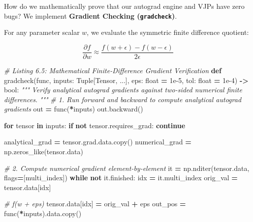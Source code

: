 \documentclass[
  letterpaper,
]{scrbook}
\newenvironment{Shaded}{\begin{snugshade}}{\end{snugshade}}
\newcommand{\BuiltInTok}[1]{#1}
\newcommand{\CommentTok}[1]{\textcolor[rgb]{0.56,0.35,0.01}{\textit{#1}}}
\newcommand{\ControlFlowTok}[1]{\textcolor[rgb]{0.13,0.29,0.53}{\textbf{#1}}}
\newcommand{\FloatTok}[1]{\textcolor[rgb]{0.00,0.00,0.81}{#1}}
\newcommand{\KeywordTok}[1]{\textcolor[rgb]{0.13,0.29,0.53}{\textbf{#1}}}
\newcommand{\NormalTok}[1]{#1}
\newcommand{\OperatorTok}[1]{\textcolor[rgb]{0.81,0.36,0.00}{\textbf{#1}}}
\newcommand{\StringTok}[1]{\textcolor[rgb]{0.31,0.60,0.02}{#1}}
\begin{document}
How do we mathematically prove that our autograd engine and VJPs have
zero bugs? We implement \textbf{Gradient Checking (\texttt{gradcheck})}.

For any parameter scalar \(w\), we evaluate the symmetric finite
difference quotient:

\[\frac{\partial f}{\partial w} \approx \frac{f(w + \epsilon) - f(w - \epsilon)}{2\epsilon}\]

\begin{Shaded}
\begin{Highlighting}[]
\CommentTok{\# Listing 6.5: Mathematical Finite{-}Difference Gradient Verification}
\KeywordTok{def}\NormalTok{ gradcheck(func, inputs: Tuple[Tensor, ...], eps: }\BuiltInTok{float} \OperatorTok{=} \FloatTok{1e{-}5}\NormalTok{, tol: }\BuiltInTok{float} \OperatorTok{=} \FloatTok{1e{-}4}\NormalTok{) }\OperatorTok{{-}\textgreater{}} \BuiltInTok{bool}\NormalTok{:}
    \CommentTok{"""}
\CommentTok{    Verify analytical autograd gradients against two{-}sided numerical finite differences.}
\CommentTok{    """}
    \CommentTok{\# 1. Run forward and backward to compute analytical autograd gradients}
\NormalTok{    out }\OperatorTok{=}\NormalTok{ func(}\OperatorTok{*}\NormalTok{inputs)}
\NormalTok{    out.backward()}

    \ControlFlowTok{for}\NormalTok{ tensor }\KeywordTok{in}\NormalTok{ inputs:}
        \ControlFlowTok{if} \KeywordTok{not}\NormalTok{ tensor.requires\_grad:}
            \ControlFlowTok{continue}

\NormalTok{        analytical\_grad }\OperatorTok{=}\NormalTok{ tensor.grad.data.copy()}
\NormalTok{        numerical\_grad }\OperatorTok{=}\NormalTok{ np.zeros\_like(tensor.data)}

        \CommentTok{\# 2. Compute numerical gradient element{-}by{-}element}
\NormalTok{        it }\OperatorTok{=}\NormalTok{ np.nditer(tensor.data, flags}\OperatorTok{=}\NormalTok{[}\StringTok{\textquotesingle{}multi\_index\textquotesingle{}}\NormalTok{])}
        \ControlFlowTok{while} \KeywordTok{not}\NormalTok{ it.finished:}
\NormalTok{            idx }\OperatorTok{=}\NormalTok{ it.multi\_index}
\NormalTok{            orig\_val }\OperatorTok{=}\NormalTok{ tensor.data[idx]}

            \CommentTok{\# f(w + eps)}
\NormalTok{            tensor.data[idx] }\OperatorTok{=}\NormalTok{ orig\_val }\OperatorTok{+}\NormalTok{ eps}
\NormalTok{            out\_pos }\OperatorTok{=}\NormalTok{ func(}\OperatorTok{*}\NormalTok{inputs).data.copy()}


\end{Highlighting}
\end{Shaded}
\end{document}

